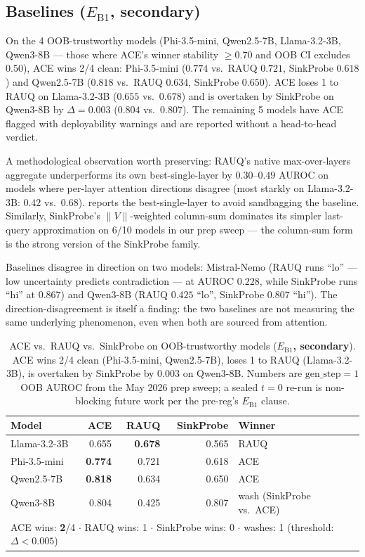 \documentclass[10pt, letterpaper]{article}
\newcommand{\eb}[1]{$E_{\text{B}#1}$}
\begin{document}
\subsection{Baselines (\eb{1}, secondary)}
\label{sec:results:baselines}

On the 4 OOB-trustworthy models (Phi-3.5-mini, Qwen2.5-7B,
Llama-3.2-3B, Qwen3-8B --- those where ACE's winner stability
$\geq 0.70$ and OOB CI excludes 0.50), ACE wins 2/4 clean:
Phi-3.5-mini ($0.774$ vs.\ RAUQ $0.721$, SinkProbe $0.618$) and
Qwen2.5-7B ($0.818$ vs.\ RAUQ $0.634$, SinkProbe $0.650$). ACE loses
1 to RAUQ on Llama-3.2-3B ($0.655$ vs.\ $0.678$) and is overtaken by
SinkProbe on Qwen3-8B by $\Delta{=}0.003$ ($0.804$ vs.\ $0.807$).
The remaining 5 models have ACE flagged with deployability warnings
and are reported without a head-to-head verdict.

A methodological observation worth preserving: RAUQ's native
max-over-layers aggregate underperforms its own best-single-layer by
$0.30$--$0.49$ AUROC on models where per-layer attention directions
disagree (most starkly on Llama-3.2-3B: $0.42$ vs.\ $0.68$).
 reports the best-single-layer to avoid
sandbagging the baseline. Similarly, SinkProbe's $\|V\|$-weighted
column-sum dominates its simpler last-query approximation on 6/10
models in our prep sweep --- the column-sum form is the strong
version of the SinkProbe family.

Baselines disagree in direction on two models: Mistral-Nemo (RAUQ
runs ``lo'' --- low uncertainty predicts contradiction --- at AUROC
$0.228$, while SinkProbe runs ``hi'' at $0.867$) and Qwen3-8B (RAUQ
$0.425$ ``lo'', SinkProbe $0.807$ ``hi''). The direction-disagreement
is itself a finding: the two baselines are not measuring the same
underlying phenomenon, even when both are sourced from attention.

\begin{table}[h]
\centering
\caption{ACE vs.\ RAUQ vs.\ SinkProbe on OOB-trustworthy models
(\textbf{\eb{1}, secondary}). ACE wins 2/4 clean (Phi-3.5-mini,
Qwen2.5-7B), loses 1 to RAUQ (Llama-3.2-3B), is overtaken by
SinkProbe by $0.003$ on Qwen3-8B. Numbers are
$\text{gen\_step}{=}1$ OOB AUROC from the May 2026 prep sweep; a
sealed $t{=}0$ re-run is non-blocking future work per the pre-reg's
\eb{1} clause.}
\label{tab:ace_baselines}
\small
\setlength{\tabcolsep}{6pt}
\begin{tabular}{@{}lrrrl@{}}
\toprule
\textbf{Model} & \textbf{ACE} & \textbf{RAUQ} & \textbf{SinkProbe} & \textbf{Winner} \\
\midrule
Llama-3.2-3B & 0.655 & \textbf{0.678} & 0.565 & RAUQ \\
Phi-3.5-mini & \textbf{0.774} & 0.721 & 0.618 & ACE \\
Qwen2.5-7B & \textbf{0.818} & 0.634 & 0.650 & ACE \\
Qwen3-8B & 0.804 & 0.425 & 0.807 & wash (SinkProbe vs.\ ACE) \\
\midrule
\multicolumn{5}{l}{ACE wins: \textbf{2}/4 $\cdot$ RAUQ wins: 1 $\cdot$ SinkProbe wins: 0 $\cdot$ washes: 1 (threshold: $\Delta < 0.005$)} \\
\bottomrule
\end{tabular}
\end{table}
\end{document}
